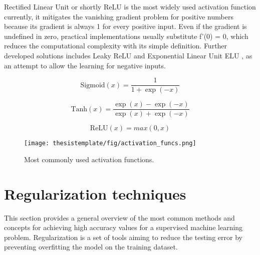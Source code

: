 Rectified Linear Unit or shortly ReLU is the most widely used activation function currently, it mitigates the vanishing gradient problem for positive numbers because its gradient is always 1 for every positive input. Even if the gradient is undefined in zero, practical implementations usually substitute f'(0) = 0, which reduces the computational complexity with its simple definition. Further developed solutions includes Leaky ReLU \cite{DBLP:leakyReLU} and  Exponential Linear Unit ELU \cite{clevert2015fast_elu}, as an attempt to allow the learning for negative inputs.

\begin{equation}
    \mathrm{Sigmoid}(x) = \frac{1}{1 + \exp(-x)}
\end{equation}

\begin{equation}
    \mathrm{Tanh}(x) = \frac{\exp(x) - \exp(-x) }{\exp(x) + \exp(-x)}
\end{equation}

\begin{equation}
    \mathrm{ReLU}(x) = max(0,x)
\end{equation}

\begin{figure}[ht]
  \begin{center}
    \texttt{[image: thesistemplate/fig/activation\_funcs.png]}
    \caption{Most commonly used activation functions.}
    \label{fig:act_func}
  \end{center}
\end{figure}



\section{Regularization techniques}


This section provides a general overview of the most common methods and concepts for achieving high accuracy values for a supervised machine learning problem. Regularization is a set of tools aiming to reduce the testing error by preventing overfitting the model on the training dataset.

